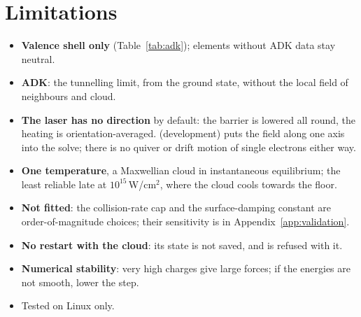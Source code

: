 \section{Limitations}

\begin{itemize}
  \item \textbf{Valence shell only} (Table~\ref{tab:adk}); elements without ADK data stay neutral.
  \item \textbf{ADK}: the tunnelling limit, from the ground state, without the local field of neighbours and cloud.
  \item \textbf{The laser has no direction} by default: the barrier is lowered all round, the heating is
    orientation-averaged.  (development) puts the field along one axis into the solve;
    there is no quiver or drift motion of single electrons either way.
  \item \textbf{One temperature}, a Maxwellian cloud in instantaneous equilibrium; the least reliable late at
    $10^{15}$\,W/cm$^2$, where the cloud cools towards the floor.
  \item \textbf{Not fitted}: the collision-rate cap and the surface-damping constant are order-of-magnitude choices; their
    sensitivity is in Appendix~\ref{app:validation}.
  \item \textbf{No restart with the cloud}: its state is not saved, and  is refused with it.
  \item \textbf{Numerical stability}: very high charges give large forces; if the energies are not smooth, lower the step.
  \item Tested on Linux only.
\end{itemize}
